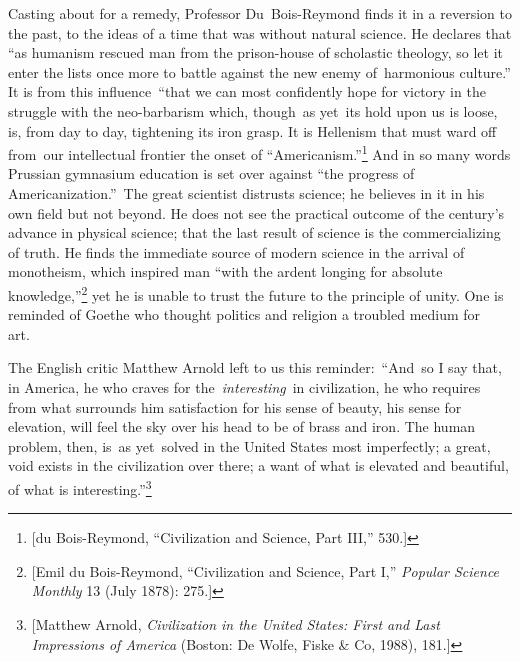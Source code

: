 \documentclass[openany,nobib]{tufte-book}
\begin{document}
Casting about for a remedy, Professor Du~Bois-Reymond finds it in a
reversion to the past, to the ideas of a time that was without natural
science. He declares that ``as humanism rescued man from the
prison-house of scholastic theology, so let it enter the lists once more
to battle against the new enemy of~harmonious culture.'' It is from this
influence~``that we can most confidently hope for victory in the
struggle with the neo-barbarism which, though~as yet~its hold upon us is
loose, is, from day to day, tightening its iron grasp. It is Hellenism
that must ward off from~our intellectual frontier the onset of
``Americanism.''\footnote{{[}du Bois-Reymond, ``Civilization and
  Science, Part III,'' 530.{]}} And in so many words Prussian gymnasium
education is set over against ``the progress of Americanization.''~The
great scientist distrusts science; he believes in it in his own field
but not beyond. He does not see the practical outcome of the century's
advance in physical science; that the last result of science is the
commercializing of truth. He finds the immediate source of modern
science in the arrival of monotheism, which inspired man ``with the
ardent longing for absolute knowledge,''\footnote{{[}Emil du
  Bois-Reymond, ``Civilization and Science, Part I,'' \emph{Popular
  Science Monthly} 13 (July 1878): 275.{]}} yet he is unable to trust
the future to the principle of unity. One is reminded of Goethe who
thought politics and religion a troubled medium for art.~

The English critic Matthew Arnold left to us this reminder:~``And~so I
say that, in America, he who craves for the\emph{~interesting}~in
civilization, he who requires from what surrounds him satisfaction for
his sense of beauty, his sense for elevation, will feel the sky over his
head to be of brass and iron. The human problem, then, is~as yet~solved
in the United States most imperfectly; a great, void exists in the
civilization over there; a want of what is elevated and beautiful, of
what is interesting.''\footnote{{[}Matthew Arnold, \emph{Civilization in
  the United States: First and Last Impressions of America} (Boston: De
  Wolfe, Fiske \& Co, 1988), 181.{]}}~
\end{document}
